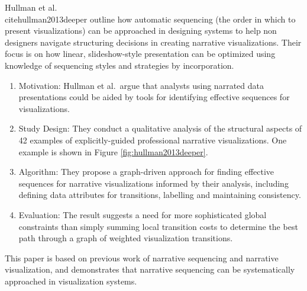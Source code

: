 \documentclass{egpubl}
\begin{document}
Hullman et al.\\cite{hullman2013deeper} outline how automatic sequencing (the order in which to present visualizations) can be approached in designing systems to help non designers navigate structuring decisions in creating narrative visualizations. Their focus is on how linear, slideshow-style presentation can be optimized using knowledge of sequencing styles and strategies by incorporation.
\begin{enumerate}
\item Motivation: Hullman et al.\ argue that analysts using narrated data presentations could be aided by tools for identifying effective sequences for visualizations.
\item Study Design: They conduct a qualitative analysis of the structural aspects of 42 examples of explicitly-guided professional narrative visualizations. One example is shown in Figure \ref{fig:hullman2013deeper}.
\item Algorithm: They propose a graph-driven approach for finding effective sequences for narrative visualizations informed by their analysis, including defining data attributes for transitions, labelling and maintaining consistency.
\item Evaluation: The result suggests a need for more sophisticated global constraints than simply summing local transition costs to determine the best path through a graph of weighted visualization transitions.
\end{enumerate}
This paper is based on previous work of narrative sequencing\cite{black1979} and narrative visualization\cite{hullman,segal}, and demonstrates that narrative sequencing can be systematically approached in visualization systems.
\end{document}
